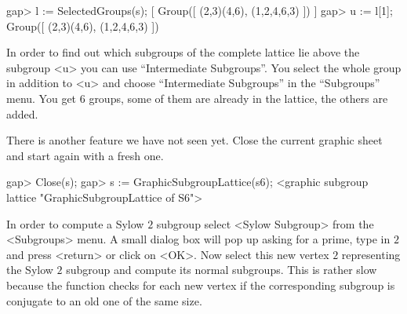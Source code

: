 \begintt
gap> l := SelectedGroups(s);
[ Group([ (2,3)(4,6), (1,2,4,6,3) ]) ]
gap> u := l[1];
Group([ (2,3)(4,6), (1,2,4,6,3) ])
\endtt

In order  to find out which subgroups  of the complete lattice  lie above
the subgroup <u> you can  use ``Intermediate Subgroups''. You select the
whole group in addition to <u> and choose ``Intermediate Subgroups'' in the 
``Subgroups'' menu. You get 6 groups, some of them are already in the
lattice, the others are added.

There is another feature we have not seen yet.  Close the current graphic
sheet and start again with a fresh one.

\begintt
gap> Close(s);
gap> s := GraphicSubgroupLattice(s6);
<graphic subgroup lattice "GraphicSubgroupLattice of S6">
\endtt

In order to compute a Sylow $2$ subgroup select <Sylow Subgroup> from the
<Subgroups> menu.   A small dialog box  will  pop up asking  for a prime,
type in  $2$ and press <return> or  click on <OK>.   Now select  this new
vertex $2$   representing the Sylow $2$  subgroup  and compute its normal
subgroups.  This is rather slow because the  function checks for each new
vertex if the corresponding  subgroup is conjugate to  an old one  of the
same size.  


%
%
%
%

